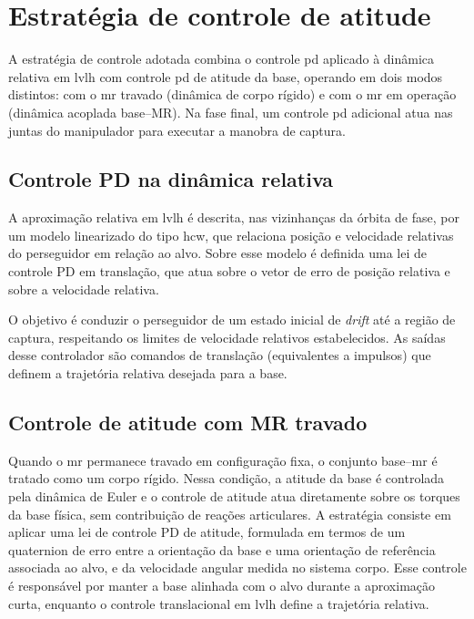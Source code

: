 \section{Estratégia de controle de atitude}
\label{sec:controle_atitude}

A estratégia de controle adotada combina o controle \gls{pd} aplicado à dinâmica relativa em \gls{lvlh} com controle \gls{pd} de atitude da base, operando em dois modos distintos: com o \gls{mr} travado (dinâmica de corpo rígido) e com o \gls{mr} em operação (dinâmica acoplada base--MR).
Na fase final, um controle \gls{pd} adicional atua nas juntas do manipulador para executar a manobra de captura.

\subsection{Controle PD na dinâmica relativa}
\label{sec:controle_PD_HCW}

A aproximação relativa em \gls{lvlh} é descrita, nas vizinhanças da órbita de fase, por um modelo linearizado do tipo \gls{hcw}, que relaciona posição e velocidade relativas do perseguidor em relação ao alvo.
Sobre esse modelo é definida uma lei de controle PD em translação, que atua sobre o vetor de erro de posição relativa e sobre a velocidade relativa.

O objetivo é conduzir o perseguidor de um estado inicial de \textit{drift} até a região de captura, respeitando os limites de velocidade relativos estabelecidos.
As saídas desse controlador são comandos de translação (equivalentes a impulsos) que definem a trajetória relativa desejada para a base.

\subsection{Controle de atitude com MR travado}
\label{sec:controle_atitude_Euler}

Quando o \gls{mr} permanece travado em configuração fixa, o conjunto base--\gls{mr} é tratado como um corpo rígido.
Nessa condição, a atitude da base é controlada pela dinâmica de Euler e o controle de atitude atua diretamente sobre os torques da base física, sem contribuição de reações articulares.
A estratégia consiste em aplicar uma lei de controle PD de atitude, formulada em termos de um quaternion de erro entre a orientação da base e uma orientação de referência associada ao alvo, e da velocidade angular medida no sistema corpo.
Esse controle é responsável por manter a base alinhada com o alvo durante a aproximação curta, enquanto o controle translacional em \gls{lvlh} define a trajetória relativa.

